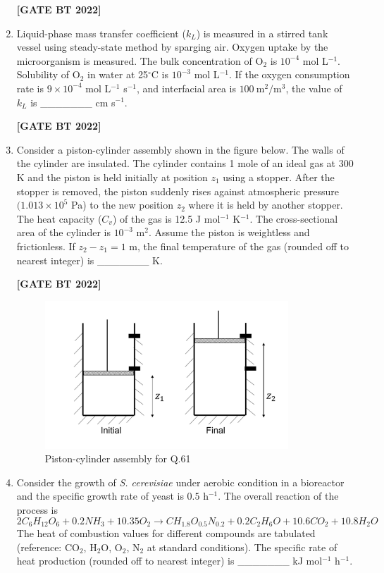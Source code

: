 \documentclass[12pt]{article}
\begin{document}
\begin{enumerate}[leftmargin=2.5em, label=\textbf{Q.\arabic*}., itemsep=2em, resume]
\noindent \textbf{[GATE BT 2022]}

\item Liquid-phase mass transfer coefficient ($k_L$) is measured in a stirred tank vessel using steady-state method by sparging air.  
Oxygen uptake by the microorganism is measured.  
The bulk concentration of O$_2$ is $10^{-4}$ mol L$^{-1}$.  
Solubility of O$_2$ in water at 25$^{\circ}$C is $10^{-3}$ mol L$^{-1}$.  
If the oxygen consumption rate is $9\times10^{-4}$ mol L$^{-1}$ s$^{-1}$, and interfacial area is $100~\text{m}^2/\text{m}^3$, the value of $k_L$ is \_\_\_\_\_\_\_ cm s$^{-1}$.

\noindent \textbf{[GATE BT 2022]}

\item Consider a piston-cylinder assembly shown in the figure below.  
The walls of the cylinder are insulated. The cylinder contains 1 mole of an ideal gas at 300 K and the piston is held initially at position $z_1$ using a stopper.  
After the stopper is removed, the piston suddenly rises against atmospheric pressure $(1.013 \times 10^5$ Pa) to the new position $z_2$ where it is held by another stopper.  
The heat capacity ($C_v$) of the gas is 12.5 J mol$^{-1}$ K$^{-1}$.  
The cross-sectional area of the cylinder is $10^{-3}$ m$^2$.  
Assume the piston is weightless and frictionless.  
If $z_2 - z_1 = 1$ m, the final temperature of the gas (rounded off to nearest integer) is \_\_\_\_\_\_\_ K.

\noindent \textbf{[GATE BT 2022]}
\begin{figure}[H]\centering
\includegraphics[width=0.6\columnwidth]{figs/q61.png}
\caption{Piston-cylinder assembly for Q.61}
\label{fig:q61}
\end{figure}

\item Consider the growth of \textit{S. cerevisiae} under aerobic condition in a bioreactor and the specific growth rate of yeast is $0.5$ h$^{-1}$.  
The overall reaction of the process is  
\[
2C_6H_{12}O_6 + 0.2NH_3 + 10.35O_2 \rightarrow CH_{1.8}O_{0.5}N_{0.2} + 0.2C_2H_6O + 10.6CO_2 + 10.8H_2O
\]
The heat of combustion values for different compounds are tabulated (reference: CO$_2$, H$_2$O, O$_2$, N$_2$ at standard conditions).  
The specific rate of heat production (rounded off to nearest integer) is \_\_\_\_\_\_\_ kJ mol$^{-1}$ h$^{-1}$.


\end{enumerate}
\end{document}
